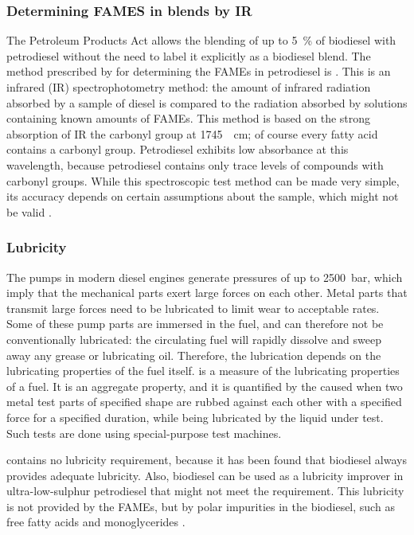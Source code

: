 \subsubsection[FAMEs by IR]{Determining FAMES in blends by IR} The Petroleum
Products Act allows the blending of up to \SI{5}{\percent} of biodiesel with
petrodiesel without the need to label it explicitly as a biodiesel blend. The
method prescribed by  for determining the FAMEs in petrodiesel is
. This is an infrared (IR) spectrophotometry method: the amount of
infrared radiation absorbed by a sample of diesel is compared to the radiation
absorbed by solutions containing known amounts of FAMEs. This method is based on
the strong absorption of IR the carbonyl group at \SI{1745}{\per\centi\metre};
of course every fatty acid contains a carbonyl group. Petrodiesel exhibits low
absorbance at this wavelength, because petrodiesel contains only trace levels of
compounds with carbonyl groups. While this spectroscopic test method can be made
very simple, its accuracy depends on certain assumptions about the sample, which
might not be valid \autocite{Pinho2014}.

\subsubsection{Lubricity}
The pumps in modern diesel engines generate pressures of up to \SI{2500}{\bar},
which imply that the mechanical parts exert large forces on each other.
Metal parts that transmit large forces need to be lubricated to limit wear to
acceptable rates. Some of these pump parts are immersed in the fuel, and can
therefore not be conventionally lubricated: the circulating fuel will rapidly
dissolve and sweep away any grease or lubricating oil. Therefore, the
lubrication depends on the lubricating properties of the fuel itself.
 is a measure of the lubricating properties of a fuel. It is
an aggregate property, and it is quantified by the  caused
when two metal test parts of specified shape are rubbed against each other with
a specified force for a specified duration, while being lubricated by the liquid
under test. Such tests are done using special-purpose test machines.

 contains no lubricity requirement, because it has been found
that biodiesel always provides adequate lubricity. Also, biodiesel can be used
as a lubricity improver in ultra-low-sulphur petrodiesel that might not meet the
requirement. This lubricity is not provided by the FAMEs, but by polar
impurities in the biodiesel, such as free fatty acids and monoglycerides
\autocite{Knothe2005}.

